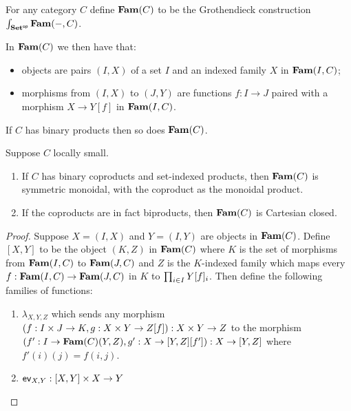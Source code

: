 \begin{definition}
For any category $C$ define $\mathbf{Fam}(C)$ to be the Grothendieck construction
$\int_{\mathbf{Set}^{\mathsf{op}}}\mathbf{Fam}(-,C)$.
\end{definition}

In $\mathbf{Fam}(C)$ we then have that:
\begin{itemize}
\item objects are pairs $(I, X)$ of a set $I$ and an indexed family $X$ in $\mathbf{Fam}(I,C)$;
\item morphisms from $(I, X)$ to $(J, Y)$ are functions $f: I \to J$ paired with a morphism $X \to Y[f]$ in
$\mathbf{Fam}(I,C)$.
\end{itemize}

\begin{proposition}
If $C$ has binary products then so does $\mathbf{Fam}(C)$.
\end{proposition}

\begin{proposition}
Suppose $C$ locally small.
\begin{enumerate}
\item If $C$ has binary coproducts and set-indexed products, then $\mathbf{Fam}(C)$ is symmetric monoidal, with the
coproduct as the monoidal product.
\item If the coproducts are in fact biproducts, then $\mathbf{Fam}(C)$ is Cartesian closed.
\end{enumerate}
\end{proposition}

\begin{proof}
Suppose $X = (I, X)$ and $Y = (I, Y)$ are objects in $\mathbf{Fam}(C)$. Define $[X, Y]$ to be the object $(K,Z)$ in
$\mathbf{Fam}(C)$ where $K$ is the set of morphisms from $\mathbf{Fam}(I,C)$ to $\mathbf{Fam}(J,C)$ and $Z$ is the $K$-indexed family
which maps every $f: \mathbf{Fam}(I,C) \to \mathbf{Fam}(J,C)$ in $K$ to $\prod_{i \in I}Y[f]_i$. Then define the
following families of functions:

\begin{enumerate}
\item $\lambda_{X,Y,Z}$ which sends any morphism $(f: I \times J \to K, g: X \times Y \to Z[f]): X
\times Y \to Z$ to the morphism $(f': I \to \mathbf{Fam}(C)(Y,Z), g': X \to [Y, Z][f']): X \to [Y, Z]$ where
$f'(i)(j) = f(i,j)$.
\item $\mathsf{ev}_{X,Y}: [X, Y] \times X \to Y$
\end{enumerate}
\end{proof}
